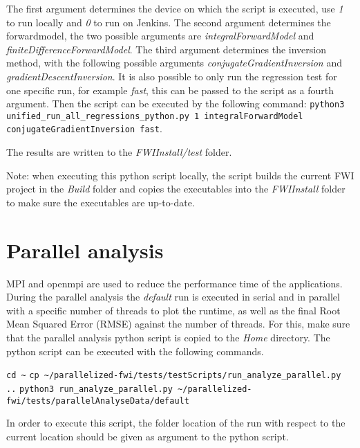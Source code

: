 \documentclass[10pt]{article}
\begin{document}
The first argument determines the device on which the script is executed, use \textit{1} to run locally and \textit{0} to run on Jenkins. The second argument determines the forwardmodel, the two possible arguments are \textit{integralForwardModel} and \textit{finiteDifferenceForwardModel}. The third argument determines the inversion method, with the following possible arguments \textit{conjugateGradientInversion} and \textit{gradientDescentInversion}. It is also possible to only run the regression test for one specific run, for example \textit{fast}, this can be passed to the script as a fourth argument. Then the script can be executed by the following command:
\newline
\texttt{python3 unified\_run\_all\_regressions\_python.py 1 integralForwardModel conjugateGradientInversion fast}.
\newline

The results are written to the \textit{FWIInstall/test} folder.
\newline

Note: when executing this python script locally, the script builds the current FWI project in the \textit{Build} folder and copies the executables into the \textit{FWIInstall} folder to make sure the executables are up-to-date.


\section{Parallel analysis}
MPI and openmpi are used to reduce the performance time of the applications. During the parallel analysis the \textit{default} run is executed in serial and in parallel with a specific number of threads to plot the runtime, as well as the final Root Mean Squared Error (RMSE) against the number of threads. For this, make sure that the parallel analysis python script is copied to the \textit{Home} directory. The python script can be executed with the following commands.
\newline

\texttt{cd \~}
\newline
\texttt{cp \textasciitilde/parallelized-fwi/tests/testScripts/run\_analyze\_parallel.py ..}
\newline
\texttt{python3 run\_analyze\_parallel.py \textasciitilde/parallelized-fwi/tests/parallelAnalyseData/default}
\newline

In order to execute this script, the folder location of the run with respect to the current location should be given as argument to the python script.
\newline
\end{document}
